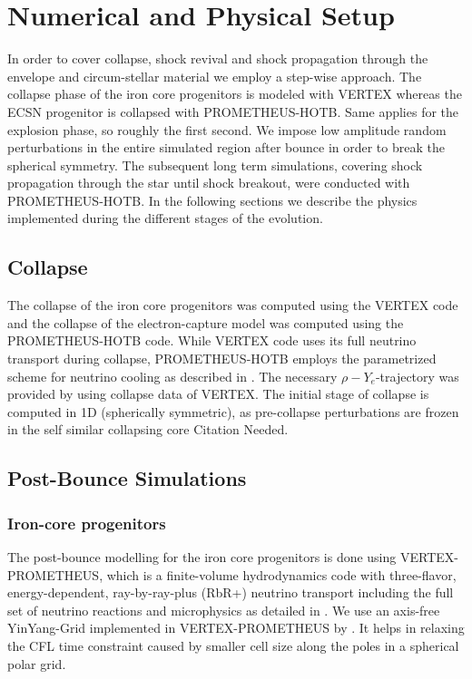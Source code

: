 \documentclass[fleqn,usenatbib]{mnras}
\newcommand{\prom}{\textsc{P{\footnotesize ROMETHEUS}-H{\footnotesize OT}B}\xspace}
\newcommand{\vertexprom}{\textsc{V{\footnotesize ERTEX}-P{\footnotesize ROMETHEUS}}\xspace}
\newcommand{\vertex}{\textsc{V{\footnotesize ERTEX}}\xspace}
\newcommand{\COM}[1]{{\color{orange}#1}}
\begin{document}
\section{Numerical and Physical Setup}
\label{sec:Numerical and physical Setup}
In order to cover collapse, shock revival and shock propagation through the envelope and circum-stellar material we employ a step-wise approach.
The collapse phase of the iron core progenitors is modeled with \vertex whereas the ECSN progenitor is collapsed with \prom.
Same applies for the explosion phase, so roughly the first second.  We impose low amplitude random perturbations in the entire simulated region after bounce in order to break the spherical symmetry. 
The subsequent long term simulations, covering shock propagation through the star until shock breakout, were conducted with \prom.
In the following sections we describe the physics implemented during the different stages of the evolution.

\subsection{Collapse}
\label{sec:Collapse}
The collapse of the iron core progenitors was computed using the \vertex code and the collapse of the  electron-capture model was computed using the \prom code. While \vertex code uses its full neutrino transport during collapse, \prom employs the parametrized scheme for neutrino cooling as described in \citet{Liebendoerfer2005}. The necessary $\rho-Y_{e}$-trajectory was provided by \cite{Huedepohl2018} using collapse data of \vertex.
The initial stage of collapse is computed in  1D (spherically symmetric), as pre-collapse perturbations are frozen in the self similar collapsing core \COM{Citation Needed}.

\subsection{Post-Bounce Simulations}
\subsubsection{Iron-core progenitors}
The post-bounce modelling for the iron core progenitors is done using \vertexprom, which is a finite-volume hydrodynamics code with three-flavor, energy-dependent, ray-by-ray-plus (RbR+) neutrino transport including the full set of neutrino reactions and microphysics as detailed in \cite{Rampp2002}. We use an axis-free YinYang-Grid \cite{Kageyama2004} implemented in \vertexprom by \cite{Melson2015a}. It  helps in relaxing the CFL time constraint caused by smaller cell size along the poles in a spherical polar grid. 
\end{document}
